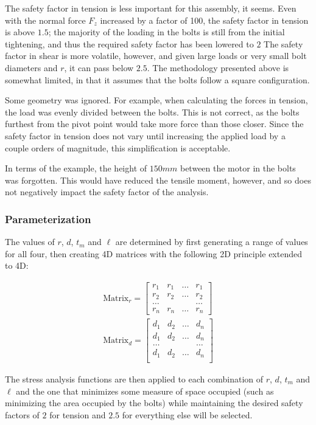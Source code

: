 The safety factor in tension is less important for this assembly, it seems.
Even with the normal force $F_z$ increased by a factor of 100, the safety factor in tension is above $1.5$; the majority of the loading in the bolts is still from the initial tightening, and thus the required safety factor has been lowered to $2$
The safety factor in shear is more volatile, however, and given large loads or very small bolt diameters and $r$, it can pass below $2.5$.
The methodology presented above is somewhat limited, in that it assumes that the bolts follow a square configuration.

Some geometry was ignored.
For example, when calculating the forces in tension, the load was evenly divided between the bolts. This is not correct, as the bolts furthest from the pivot point would take more force than those closer.
Since the safety factor in tension does not vary until increasing the applied load by a couple orders of magnitude, this simplification is acceptable.

In terms of the example, the height of $150mm$ between the motor in the bolts was forgotten.
This would have reduced the tensile moment, however, and so does not negatively impact the safety factor of the analysis.


\subsubsection{Parameterization}

The values of $r$, $d$, $t_m$ and $\ell$ are determined by first generating a range of values for all four, then creating 4D matrices with the following 2D principle extended to 4D:

\begin{gather}
    \text{Matrix}_r = 
    \begin{bmatrix}{}
        r_1 & r_1 & \dots & r_1 \\
        r_2 & r_2 & \dots & r_2 \\
        \dots  &  &       & \dots \\
        r_n & r_n & \dots & r_n
    \end{bmatrix}
    \\
    \text{Matrix}_d = 
    \begin{bmatrix}{}
        d_1 & d_2 & \dots & d_n \\
        d_1 & d_2 & \dots & d_n \\
        \dots & & & \dots \\
        d_1 & d_2 & \dots & d_n \\
    \end{bmatrix}
\end{gather}{}

The stress analysis functions are then applied to each combination of $r$, $d$, $t_m$ and $\ell$ and the one that minimizes some measure of space occupied (such as minimizing the area occupied by the bolts) while maintaining the desired safety factors of $2$ for tension and $2.5$ for everything else will be selected.